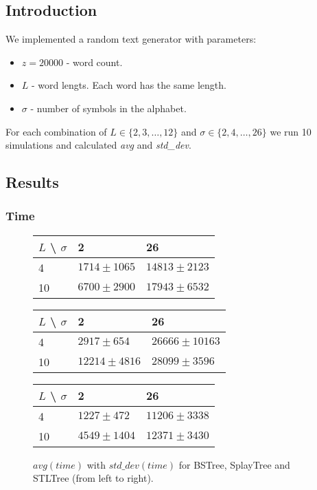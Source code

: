 \documentclass[12pt,a4paper]{article}
\begin{document}
\subsection{Introduction} 

We implemented a random text generator with parameters: 
\begin{itemize}
\item $z = 20000$ - word count. 
\item $L$ - word lengts. Each word has the same length. 
\item $\sigma$ - number of symbols in the alphabet. 
\end{itemize}

For each combination of $L \in \{2,3,\ldots,12\}$ and $\sigma \in \{2,4,\ldots,26\}$ we run 10 simulations and calculated \emph{avg} and \emph{std\_dev}. 

\newpage
\subsection{Results} 

\subsubsection{Time} 

\begin{figure}[h]
  \centering
  \begin{tabular}{|l|l|l|}
    \hline
    $L$ \textbackslash{} $\sigma$ & 2 & 26 \\
    \hline
    4  & $1714 \pm 1065$ & $14813 \pm 2123$ \\
    \hline
    10 & $6700 \pm 2900$ & $17943 \pm 6532$ \\
    \hline
  \end{tabular}
  \begin{tabular}{|l|l|l|}
    \hline
    $L$ \textbackslash{} $\sigma$ & 2 & 26 \\
    \hline
    4  & $2917 \pm 654$ & $26666 \pm 10163$ \\
    \hline
    10 & $12214 \pm 4816$ & $28099 \pm 3596$ \\
    \hline
  \end{tabular}
  \begin{tabular}{|l|l|l|}
    \hline
    $L$ \textbackslash{} $\sigma$ & 2 & 26 \\
    \hline
    4  & $1227 \pm 472$ & $11206 \pm 3338$ \\
    \hline
    10 & $4549 \pm 1404$ & $12371 \pm 3430$ \\
    \hline
  \end{tabular}
  \caption{$avg(time)$ with $std\_dev(time)$ for BSTree, SplayTree and STLTree (from left to right).}
  \label{fig:avg_std_time_table}
\end{figure}
\end{document}
